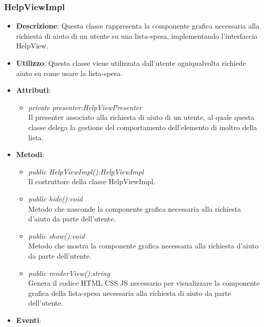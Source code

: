 \subsubsection{HelpViewImpl}
\begin{itemize}
\item \textbf{Descrizione}: Questa classe rappresenta la componente grafica necessaria alla richiesta di aiuto di un utente su una lista-spesa, implementando l'interfaccia HelpView.
\item \textbf{Utilizzo}: Questa classe viene utilizzata dall'utente ogniqualvolta richiede aiuto su come usare la lista-spesa.
\item \textbf{Attributi}:
\begin{itemize}
\item \textit{private presenter:HelpViewPresenter}\\
Il presenter associato alla richiesta di aiuto di un utente, al quale questa classe delega la gestione del comportamento dell'elemento di inoltro della lista.
\end{itemize}
\item \textbf{Metodi}:
	\begin{itemize}
	\item \textit{public HelpViewImpl():HelpViewImpl}\\
	Il costruttore della classe HelpViewImpl.
	\item \textit{public hide():void}\\
	Metodo che nasconde la componente grafica necessaria alla richiesta d'aiuto da parte dell'utente.
	\item \textit{public show():void}\\
	Metodo che mostra la componente grafica necessaria alla richiesta d'aiuto da parte dell'utente.
	\item \textit{public renderView():string}\\
	Genera il codice HTML CSS JS necessario per visualizzare la componente grafica della lista-spesa necessaria alla richiesta di aiuto da parte dell'utente.
	\end{itemize}
\item \textbf{Eventi}:
\end{itemize}

